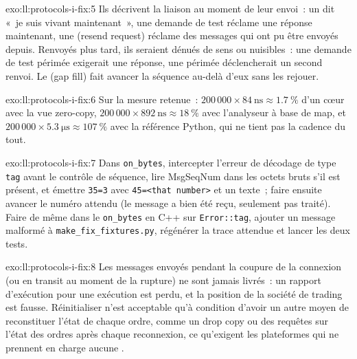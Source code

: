\begin{solution}{exo:ll:protocols-i-fix:5}
Ils décrivent la liaison au moment de leur envoi~: un  dit «~je suis vivant maintenant~», une demande de test réclame une réponse
maintenant, une  (resend request) réclame des messages qui ont pu être envoyés depuis. Renvoyés plus tard, ils seraient dénués de sens ou nuisibles~: une
demande de test périmée exigerait une réponse, une  périmée déclencherait un second renvoi. Le  (gap fill) fait avancer la séquence
au-delà d'eux sans les rejouer.
\end{solution}

\begin{solution}{exo:ll:protocols-i-fix:6}
Sur la mesure retenue~: $200\,000 \times \qty{84}{\nano\second} \approx 1.7~\%$ d'un cœur avec la vue zero-copy,
$200\,000 \times \qty{892}{\nano\second} \approx 18~\%$ avec l'analyseur à base de map, et $200\,000 \times
\qty{5.3}{\micro\second} \approx 107~\%$ avec la référence Python, qui ne tient pas la cadence du tout.
\end{solution}

\begin{solution}{exo:ll:protocols-i-fix:7}
Dans \texttt{on\_bytes}, intercepter l'erreur de décodage de type \texttt{tag} avant le contrôle de séquence, lire MsgSeqNum dans les octets bruts
s'il est présent, et émettre \texttt{35=3} avec \texttt{45=<that number>} et un texte~; faire ensuite avancer le numéro attendu (le
message a bien été reçu, seulement pas traité). Faire de même dans le \texttt{on\_bytes} en C++ sur \texttt{Error::tag}, ajouter un message malformé
à \texttt{make\_fix\_fixtures.py}, régénérer la trace attendue et lancer les deux tests.
\end{solution}

\begin{solution}{exo:ll:protocols-i-fix:8}
Les messages envoyés pendant la coupure de la connexion (ou en transit au moment de la rupture) ne sont jamais livrés~: un rapport d'exécution pour une exécution
est perdu, et la position de la société de trading est fausse. Réinitialiser n'est acceptable qu'à condition d'avoir un autre moyen de reconstituer l'état de chaque ordre,
comme un drop copy ou des requêtes sur l'état des ordres après chaque reconnexion, ce qu'exigent les plateformes qui ne prennent en charge aucune .
\end{solution}

